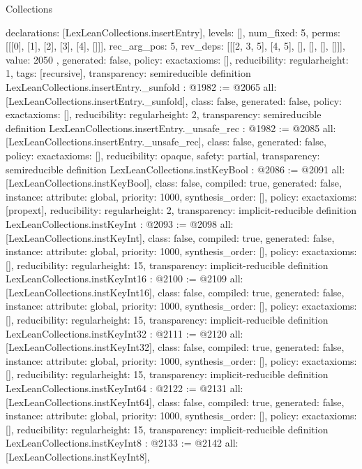\begin{lexlean}{Collections}
\begin{coremodule}
{{    declarations: [LexLeanCollections.insertEntry],
    levels: [],
    num_fixed: 5,
    perms: [[[0], [1], [2], [3], [4], []]],
    rec_arg_pos: 5,
    rev_deps: [[[2, 3, 5], [4, 5], [], [], [], []]],
    value: 2050
  },
  generated: false,
  policy: exact{axioms: []},
  reducibility: regular{height: 1},
  tags: [recursive],
  transparency: semireducible
}
definition LexLeanCollections.insertEntry._sunfold : @1982 := @2065 {
  all: [LexLeanCollections.insertEntry._sunfold],
  class: false,
  generated: false,
  policy: exact{axioms: []},
  reducibility: regular{height: 2},
  transparency: semireducible
}
definition LexLeanCollections.insertEntry._unsafe_rec : @1982 := @2085 {
  all: [LexLeanCollections.insertEntry._unsafe_rec],
  class: false,
  generated: false,
  policy: exact{axioms: []},
  reducibility: opaque{},
  safety: partial,
  transparency: semireducible
}
definition LexLeanCollections.instKeyBool : @2086 := @2091 {
  all: [LexLeanCollections.instKeyBool],
  class: false,
  compiled: true,
  generated: false,
  instance: {attribute: global, priority: 1000, synthesis_order: []},
  policy: exact{axioms: [propext]},
  reducibility: regular{height: 2},
  transparency: implicit-reducible
}
definition LexLeanCollections.instKeyInt : @2093 := @2098 {
  all: [LexLeanCollections.instKeyInt],
  class: false,
  compiled: true,
  generated: false,
  instance: {attribute: global, priority: 1000, synthesis_order: []},
  policy: exact{axioms: []},
  reducibility: regular{height: 15},
  transparency: implicit-reducible
}
definition LexLeanCollections.instKeyInt16 : @2100 := @2109 {
  all: [LexLeanCollections.instKeyInt16],
  class: false,
  compiled: true,
  generated: false,
  instance: {attribute: global, priority: 1000, synthesis_order: []},
  policy: exact{axioms: []},
  reducibility: regular{height: 15},
  transparency: implicit-reducible
}
definition LexLeanCollections.instKeyInt32 : @2111 := @2120 {
  all: [LexLeanCollections.instKeyInt32],
  class: false,
  compiled: true,
  generated: false,
  instance: {attribute: global, priority: 1000, synthesis_order: []},
  policy: exact{axioms: []},
  reducibility: regular{height: 15},
  transparency: implicit-reducible
}
definition LexLeanCollections.instKeyInt64 : @2122 := @2131 {
  all: [LexLeanCollections.instKeyInt64],
  class: false,
  compiled: true,
  generated: false,
  instance: {attribute: global, priority: 1000, synthesis_order: []},
  policy: exact{axioms: []},
  reducibility: regular{height: 15},
  transparency: implicit-reducible
}
definition LexLeanCollections.instKeyInt8 : @2133 := @2142 {
  all: [LexLeanCollections.instKeyInt8],
}
\end{coremodule}
\end{lexlean}
